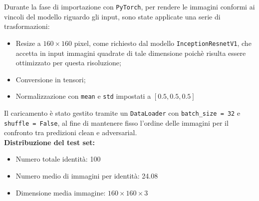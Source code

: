         \noindent Durante la fase di importazione con \texttt{PyTorch}, per rendere le immagini conformi ai vincoli del modello riguardo gli input, sono state applicate una serie di trasformazioni:
            \begin{itemize}
                \item Resize a $160 \times 160$ pixel, come richiesto dal modello \texttt{InceptionResnetV1}, che accetta in input immagini quadrate di tale dimensione poichè risulta essere ottimizzato per questa risoluzione;
                \item Conversione in tensori;
                \item Normalizzazione con \texttt{mean} e \texttt{std} impostati a $[0.5, 0.5, 0.5]$
            \end{itemize}
            
        \noindent Il caricamento è stato gestito tramite un \texttt{DataLoader} con \texttt{batch\_size = 32} e \texttt{shuffle = False}, al fine di mantenere fisso l’ordine delle immagini per il confronto tra predizioni clean e adversarial. \\            
        
        \noindent \textbf{Distribuzione del test set:}
            \begin{itemize}
                \item Numero totale identità: 100
                \item Numero medio di immagini per identità: 24.08
                \item Dimensione media immagine: $160 \times 160 \times 3$
            \end{itemize}


